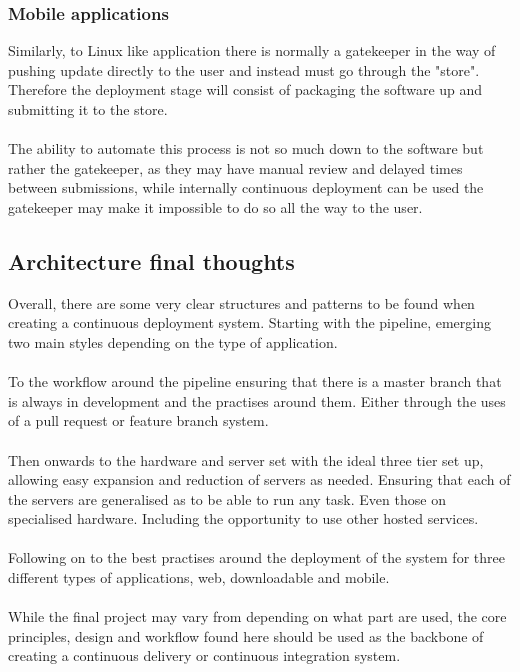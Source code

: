 \subsubsection{Mobile applications}

Similarly, to Linux like application there is normally a gatekeeper in the way of pushing update directly to the user and instead must go through the "store". Therefore the deployment stage will consist of packaging the software up and submitting it to the store. 
\\\\
The ability to automate this process is not so much down to the software but rather the gatekeeper, as they may have manual review and delayed times between submissions, while internally continuous deployment can be used the gatekeeper may make it impossible to do so all the way to the user.

\subsection{Architecture final thoughts}

Overall, there are some very clear structures and patterns to be found when creating a continuous deployment system. Starting with the pipeline, emerging two main styles depending on the type of application.
\\\\
To the workflow around the pipeline ensuring that there is a master branch that is always in development and the practises around them. Either through the uses of a pull request or feature branch system.
\\\\
Then onwards to the hardware and server set with the ideal three tier set up, allowing easy expansion and reduction of servers as needed. Ensuring that each of the servers are generalised as to be able to run any task. Even those on specialised hardware. Including the opportunity to use other hosted services.
\\\\
Following on to the best practises around the deployment of the system for three different types of applications, web, downloadable and mobile.  
\\\\
While the final project may vary from depending on what part are used, the core principles, design and workflow found here should be used as the backbone of creating a continuous delivery or continuous integration system.